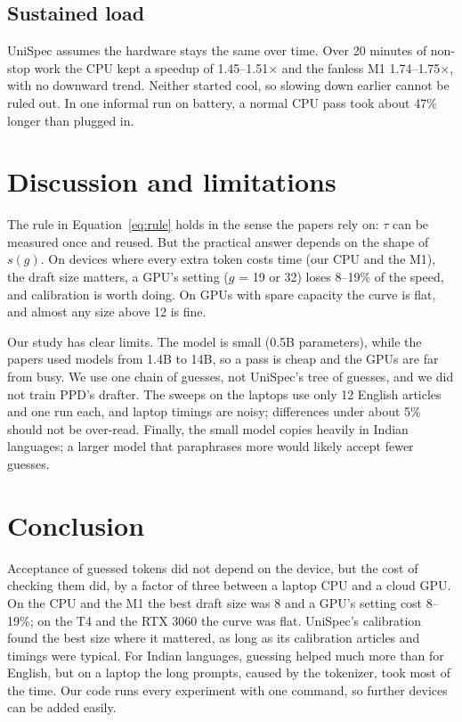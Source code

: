 \documentclass{article}
\newcommand{\tms}{\ensuremath{\times}}
\begin{document}
\subsection{Sustained load}

UniSpec assumes the hardware stays the same over time.
Over 20 minutes of non-stop work the CPU kept a speedup of 1.45--1.51\tms{} and the fanless M1 1.74--1.75\tms{}, with no downward trend.
Neither started cool, so slowing down earlier cannot be ruled out.
In one informal run on battery, a normal CPU pass took about 47\% longer than plugged in.

\section{Discussion and limitations}

The rule in Equation~\ref{eq:rule} holds in the sense the papers rely on: $\tau$ can be measured once and reused.
But the practical answer depends on the shape of $s(g)$.
On devices where every extra token costs time (our CPU and the M1), the draft size matters, a GPU's setting ($g$ = 19 or 32) loses 8--19\% of the speed, and calibration is worth doing.
On GPUs with spare capacity the curve is flat, and almost any size above 12 is fine.

Our study has clear limits.
The model is small (0.5B parameters), while the papers used models from 1.4B to 14B, so a pass is cheap and the GPUs are far from busy.
We use one chain of guesses, not UniSpec's tree of guesses, and we did not train PPD's drafter.
The sweeps on the laptops use only 12 English articles and one run each, and laptop timings are noisy; differences under about 5\% should not be over-read.
Finally, the small model copies heavily in Indian languages; a larger model that paraphrases more would likely accept fewer guesses.

\section{Conclusion}

Acceptance of guessed tokens did not depend on the device, but the cost of checking them did, by a factor of three between a laptop CPU and a cloud GPU.
On the CPU and the M1 the best draft size was 8 and a GPU's setting cost 8--19\%; on the T4 and the RTX 3060 the curve was flat.
UniSpec's calibration found the best size where it mattered, as long as its calibration articles and timings were typical.
For Indian languages, guessing helped much more than for English, but on a laptop the long prompts, caused by the tokenizer, took most of the time.
Our code runs every experiment with one command, so further devices can be added easily.
\end{document}
